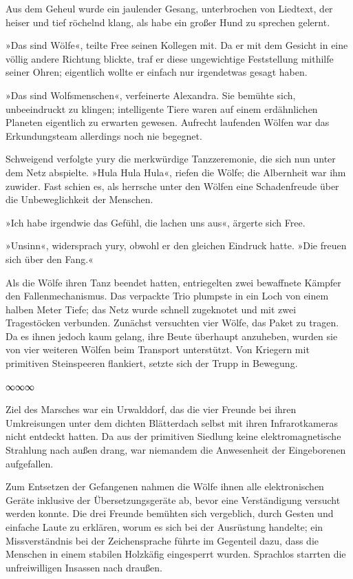 Aus dem Geheul wurde ein jaulender Gesang, unterbrochen von Liedtext, der heiser und tief röchelnd klang, als habe ein großer Hund zu sprechen gelernt.

»Das sind Wölfe«, teilte Free seinen Kollegen mit. Da er mit dem Gesicht in eine völlig andere Richtung blickte, traf er diese ungewichtige Feststellung mithilfe seiner Ohren; eigentlich wollte er einfach nur irgendetwas gesagt haben.

»Das sind Wolfsmenschen«, verfeinerte Alexandra. Sie bemühte sich, unbeeindruckt zu klingen; intelligente Tiere waren auf einem erdähnlichen Planeten eigentlich zu erwarten gewesen. Aufrecht laufenden Wölfen war das Erkundungsteam allerdings noch nie begegnet.

Schweigend verfolgte yury die merkwürdige Tanzzeremonie, die sich nun unter dem Netz abspielte. »Hula Hula Hula«, riefen die Wölfe; die Albernheit war ihm zuwider. Fast schien es, als herrsche unter den Wölfen eine Schadenfreude über die Unbeweglichkeit der Menschen.

»Ich habe irgendwie das Gefühl, die lachen uns aus«, ärgerte sich Free.

»Unsinn«, widersprach yury, obwohl er den gleichen Eindruck hatte. »Die freuen sich über den Fang.«

Als die Wölfe ihren Tanz beendet hatten, entriegelten zwei bewaffnete Kämpfer den Fallenmechanismus. Das verpackte Trio plumpste in ein Loch von einem halben Meter Tiefe; das Netz wurde schnell zugeknotet und mit zwei Tragestöcken verbunden. Zunächst versuchten vier Wölfe, das Paket zu tragen. Da es ihnen jedoch kaum gelang, ihre Beute überhaupt anzuheben, wurden sie von vier weiteren Wölfen beim Transport unterstützt. Von Kriegern mit primitiven Steinspeeren flankiert, setzte sich der Trupp in Bewegung.

\begin{center}
∞∞∞
\end{center}

Ziel des Marsches war ein Urwalddorf, das die vier Freunde bei ihren Umkreisungen unter dem dichten Blätterdach selbst mit ihren Infrarotkameras nicht entdeckt hatten. Da aus der primitiven Siedlung keine elektromagnetische Strahlung nach außen drang, war niemandem die Anwesenheit der Eingeborenen aufgefallen.

Zum Entsetzen der Gefangenen nahmen die Wölfe ihnen alle elektronischen Geräte inklusive der Übersetzungsgeräte ab, bevor eine Verständigung versucht werden konnte. Die drei Freunde bemühten sich vergeblich, durch Gesten und einfache Laute zu erklären, worum es sich bei der Ausrüstung handelte; ein Missverständnis bei der Zeichensprache führte im Gegenteil dazu, dass die Menschen in einem stabilen Holzkäfig eingesperrt wurden. Sprachlos starrten die unfreiwilligen Insassen nach draußen.

